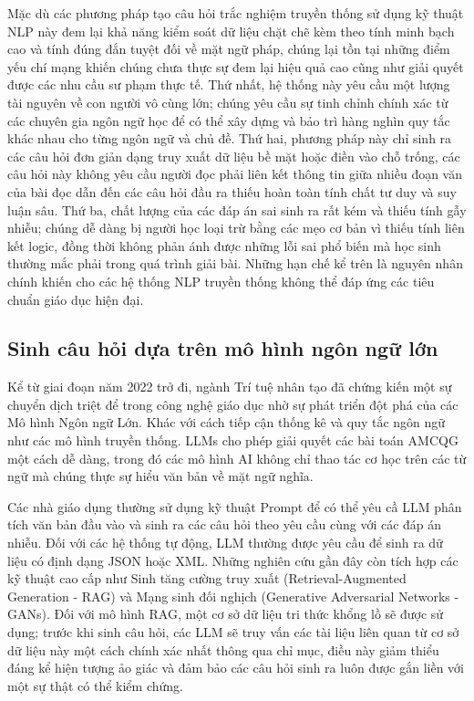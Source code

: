 Mặc dù các phương pháp tạo câu hỏi trắc nghiệm truyền thống sử dụng kỹ thuật NLP này đem lại khả năng kiểm soát dữ liệu chặt chẽ kèm theo tính minh bạch cao và tính đúng đắn tuyệt đối về mặt ngữ pháp, chúng lại tồn tại những điểm yếu chí mạng khiến chúng chưa thực sự đem lại hiệu quả cao cũng như giải quyết được các nhu cầu sư phạm thực tế. Thứ nhất, hệ thống này yêu cầu một lượng tài nguyên về con người vô cùng lớn; chúng yêu cầu sự tinh chỉnh chính xác từ các chuyên gia ngôn ngữ học để có thể xây dựng và bảo trì hàng nghìn quy tắc khác nhau cho từng ngôn ngữ và chủ đề. Thứ hai, phương pháp này chỉ sinh ra các câu hỏi đơn giản dạng truy xuất dữ liệu bề mặt hoặc điền vào chỗ trống, các câu hỏi này không yêu cầu người đọc phải liên kết thông tin giữa nhiều đoạn văn của bài đọc dẫn đến các câu hỏi đầu ra thiếu hoàn toàn tính chất tư duy và suy luận sâu. Thứ ba, chất lượng của các đáp án sai sinh ra rất kém và thiếu tính gẫy nhiễu; chúng dễ dàng bị người học loại trừ bằng các mẹo cơ bản vì thiếu tính liên kết logic, đồng thời không phản ánh được những lỗi sai phổ biến mà học sinh thường mắc phải trong quá trình giải bài. Những hạn chế kể trên là nguyên nhân chính khiến cho các hệ thống NLP truyền thống không thể đáp ứng các tiêu chuẩn giáo dục hiện đại.


\subsection{Sinh câu hỏi dựa trên mô hình ngôn ngữ lớn}

Kể từ giai đoạn năm 2022 trở đi, ngành Trí tuệ nhân tạo đã chứng kiến một sự chuyển dịch triệt để trong công nghệ giáo dục nhờ sự phát triển đột phá của các Mô hình Ngôn ngữ Lớn. Khác với cách tiếp cận thống kê và quy tắc ngôn ngữ như các mô hình truyền thống. LLMs cho phép giải quyết các bài toán AMCQG một cách dễ dàng, trong đó các mô hình AI không chỉ thao tác cơ học trên các từ ngữ mà chúng thực sự hiểu văn bản về mặt ngữ nghĩa.

Các nhà giáo dụng thường sử dụng kỹ thuật Prompt để có thể yêu cầ LLM phân tích văn bản đầu vào và sinh ra các câu hỏi theo yêu cầu cùng với các đáp án nhiễu. Đối với các hệ thống tự động, LLM thường được yêu cầu để sinh ra dữ liệu có định dạng JSON hoặc XML. Những nghiên cứu gần đây còn tích hợp các kỹ thuật cao cấp như Sinh tăng cường truy xuất (Retrieval-Augmented Generation - RAG) và Mạng sinh đối nghịch (Generative Adversarial Networks - GANs). Đối với mô hình RAG, một cơ sở dữ liệu tri thức khổng lồ sẽ được sử dụng; trước khi sinh câu hỏi, các LLM sẽ truy vấn các tài liệu liên quan từ cơ sở dữ liệu này một cách chính xác nhất thông qua chỉ mục, điều này giảm thiểu đáng kể hiện tượng ảo giác và đảm bảo các câu hỏi sinh ra luôn được gắn liền với một sự thật có thể kiểm chứng.

